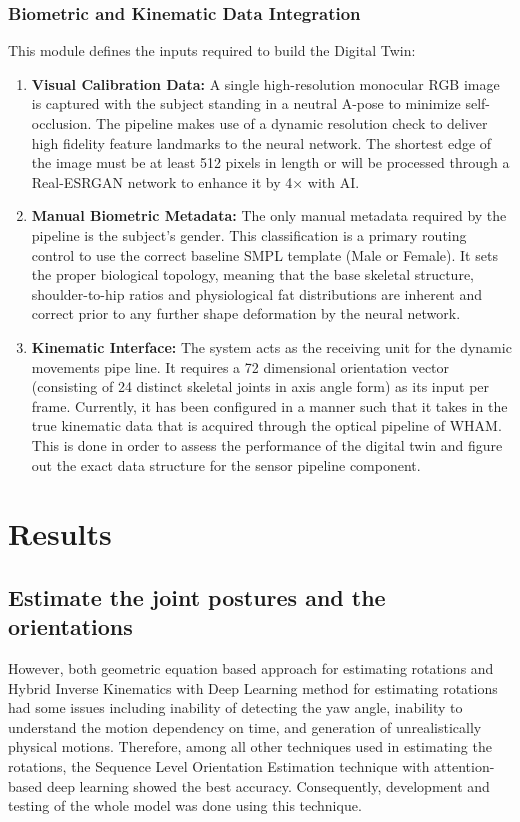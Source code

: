 \documentclass[12pt, a4paper, oneside]{report}
\begin{document}
\subsection{Biometric and Kinematic Data Integration}
This module defines the inputs required to build the Digital Twin:
\begin{enumerate}[leftmargin=*]
    \item \textbf{Visual Calibration Data:} A single high-resolution monocular RGB image is captured with the subject standing in a neutral A-pose to minimize self-occlusion. The pipeline makes use of a dynamic resolution check to deliver high fidelity feature landmarks to the neural network. The shortest edge of the image must be at least 512 pixels in length or will be processed through a Real-ESRGAN network to enhance it by 4× with AI.
    \item \textbf{Manual Biometric Metadata:} The only manual metadata required by the pipeline is the subject’s gender. This classification is a primary routing control to use the correct baseline SMPL template (Male or Female). It sets the proper biological topology, meaning that the base skeletal structure, shoulder-to-hip ratios and physiological fat distributions are inherent and correct prior to any further shape deformation by the neural network.
    \item \textbf{Kinematic Interface:} The system acts as the receiving unit for the dynamic movements pipe line. It requires a 72 dimensional orientation vector (consisting of 24 distinct skeletal joints in axis angle form) as its input per frame. Currently, it has been configured in a manner such that it takes in the true kinematic data that is acquired through the optical pipeline of WHAM. This is done in order to assess the performance of the digital twin and figure out the exact data structure for the sensor pipeline component.
\end{enumerate}
\chapter{Results}
\section{Estimate the joint postures and the orientations }

However, both geometric equation based approach for estimating rotations and Hybrid Inverse Kinematics with Deep Learning method for estimating rotations had some issues including inability of detecting the yaw angle, inability to understand the motion dependency on time, and generation of unrealistically physical motions. Therefore, among all other techniques used in estimating the rotations, the Sequence Level Orientation Estimation technique with attention-based deep learning showed the best accuracy. Consequently, development and testing of the whole model was done using this technique. 
\end{document}
